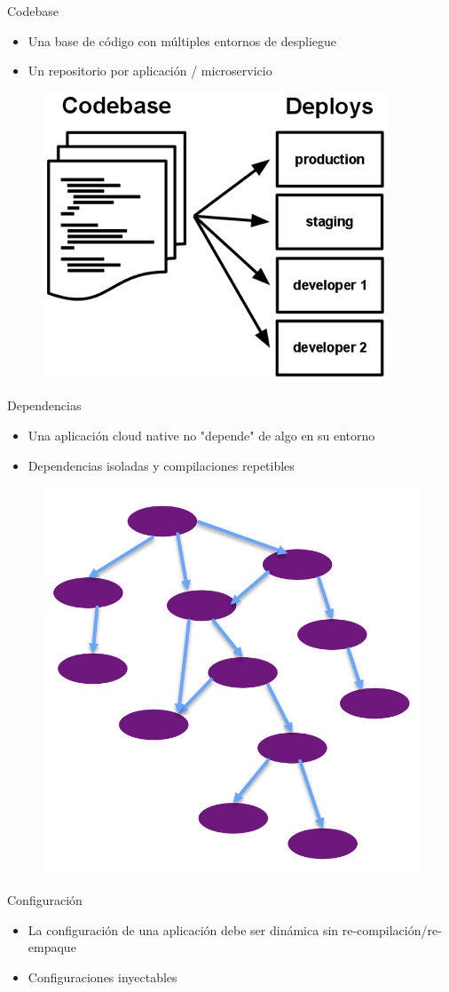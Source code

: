 \documentclass[aspectratio=169]{beamer}
\begin{document}
\begin{frame}{Codebase}
\begin{itemize}
	\item Una base de código con múltiples entornos de despliegue
	\item Un repositorio por aplicación / microservicio
\end{itemize}

\begin{figure}
	\centering
	\includegraphics[width=0.5\linewidth]{Images/121}
\end{figure}
\end{frame}


\begin{frame}{Dependencias}
\begin{itemize}
	\item Una aplicación cloud native no "depende" de algo en su entorno
	\item Dependencias isoladas y compilaciones repetibles
\end{itemize}

\begin{figure}
	\centering
	\includegraphics[width=0.4\linewidth]{Images/maven}
\end{figure}
\end{frame}


\begin{frame}{Configuración}
\begin{itemize}
	\item La configuración de una aplicación debe ser dinámica sin re-compilación/re-empaque
	\item Configuraciones inyectables
\end{itemize}
\end{frame}
\end{document}
